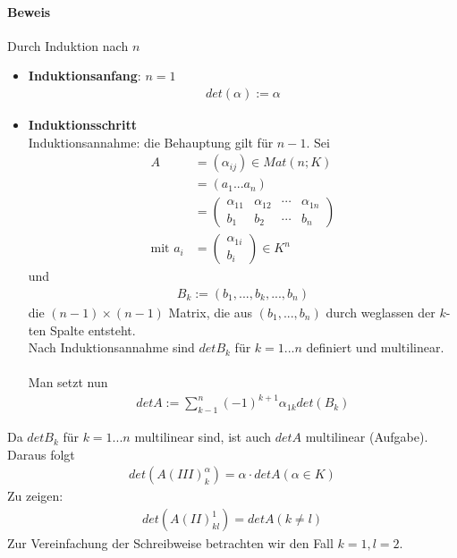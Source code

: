 \documentclass[11pt]{report}
\newcommand*\f[1] {\textbf{#1}}
\begin{document}
\paragraph{Beweis}
Durch Induktion nach $n$
\begin{itemize}
\item \f{Induktionsanfang}: $n=1$
\begin{align}
det(\alpha) := \alpha
\end{align}
\item \f{Induktionsschritt} \\
Induktionsannahme: die Behauptung gilt für $n-1$.
Sei
\begin{align}
A &= (\alpha_{ij}) \in Mat(n;K)\\
&= (a_1 ... a_n) \\
&= \begin{pmatrix} \alpha_{11} & \alpha_{12} & \cdots & \alpha_{1n} \\ b_1 & b_2 & \cdots & b_n\end{pmatrix} \\
\text{mit } a_i &= \begin{pmatrix} \alpha_{1i} \\ b_i \end{pmatrix} \in K^n
\end{align}
und
\begin{align}
B_k := (b_1, ..., b_k, ..., b_n)
\end{align}
die $(n-1) \times (n-1)$ Matrix, die aus $(b_1, ..., b_n)$ durch weglassen der $k$-ten Spalte entsteht.\\
Nach Induktionsannahme sind $det B_k$ für $k=1...n$ definiert und multilinear. \\\\
Man setzt nun
\begin{align}
det A:= \sum_{k-1}^{n} (-1)^{k+1} \alpha_{1k} det(B_k)
\end{align}
\end{itemize}
Da $det B_k$ für $k=1...n$ multilinear sind, ist auch $det A$ multilinear (Aufgabe). Daraus folgt
\begin{align}
det \left( A(III)_{k}^{\alpha} \right) = \alpha \cdot det A (\alpha \in K)
\end{align}
Zu zeigen:
\begin{align}
det \left(A(II)_{kl}^{1} \right) = det A (k \neq l)
\end{align}
Zur Vereinfachung der Schreibweise betrachten wir den Fall $k=1, l=2$.
\end{document}
